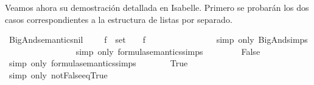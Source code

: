 \begin{isabellebody}
\begin{isamarkuptext}
  Veamos ahora su demostración detallada en Isabelle. Primero se
  probarán los dos casos correspondientes a la estructura de listas por
  separado.%
\end{isamarkuptext}\isamarkuptrue%
\isamarkupfalse%
\ BigAnd{\isacharunderscore}semantics{\isacharunderscore}nil{\isacharcolon}\ {\isachardoublequoteopen}{\isacharparenleft}{\isasymA}\ {\isasymTurnstile}\ \isactrlbold {\isasymAnd}{\isacharbrackleft}{\isacharbrackright}{\isacharparenright}\ {\isasymlongleftrightarrow}\ {\isacharparenleft}{\isasymforall}f\ {\isasymin}\ set\ {\isacharbrackleft}{\isacharbrackright}{\isachardot}\ {\isasymA}\ {\isasymTurnstile}\ f{\isacharparenright}{\isachardoublequoteclose}\isanewline
%
\isadelimproof
%
\endisadelimproof
%
\isatagproof
{}\isamarkupfalse%
{\isacharminus}\isanewline
\ \ \isamarkupfalse%
\ {\isachardoublequoteopen}{\isacharparenleft}{\isasymA}\ {\isasymTurnstile}\ \isactrlbold {\isasymAnd}{\isacharbrackleft}{\isacharbrackright}{\isacharparenright}\ {\isacharequal}\ {\isasymA}\ {\isasymTurnstile}\ {\isacharparenleft}\isactrlbold {\isasymnot}{\isasymbottom}{\isacharparenright}{\isachardoublequoteclose}\isanewline
\ \ \ \ \isamarkupfalse%
\ {\isacharparenleft}simp\ only{\isacharcolon}\ BigAnd{\isachardot}simps{\isacharparenleft}{}{\isacharparenright}{\isacharparenright}\isanewline
\ \ \isamarkupfalse%
\ \isamarkupfalse%
\ {\isachardoublequoteopen}{\isasymdots}\ {\isacharequal}\ {\isacharparenleft}{\isasymnot}\ {\isasymA}\ {\isasymTurnstile}\ {\isasymbottom}{\isacharparenright}{\isachardoublequoteclose}\isanewline
\ \ \ \ \isamarkupfalse%
\ {\isacharparenleft}simp\ only{\isacharcolon}\ formula{\isacharunderscore}semantics{\isachardot}simps{\isacharparenleft}{}{\isacharparenright}{\isacharparenright}\isanewline
\ \ \isamarkupfalse%
\ \isamarkupfalse%
\ {\isachardoublequoteopen}{\isasymdots}\ {\isacharequal}\ {\isacharparenleft}{\isasymnot}\ False{\isacharparenright}{\isachardoublequoteclose}\isanewline
\ \ \ \ \isamarkupfalse%
\ {\isacharparenleft}simp\ only{\isacharcolon}\ formula{\isacharunderscore}semantics{\isachardot}simps{\isacharparenleft}{}{\isacharparenright}{\isacharparenright}\isanewline
\ \ \isamarkupfalse%
\ \isamarkupfalse%
\ {\isachardoublequoteopen}{\isasymdots}\ {\isacharequal}\ True{\isachardoublequoteclose}\isanewline
\ \ \ \ \isamarkupfalse%
\ {\isacharparenleft}simp\ only{\isacharcolon}\ not{\isacharunderscore}False{\isacharunderscore}eq{\isacharunderscore}True{\isacharparenright}\isanewline

\end{isabellebody}
